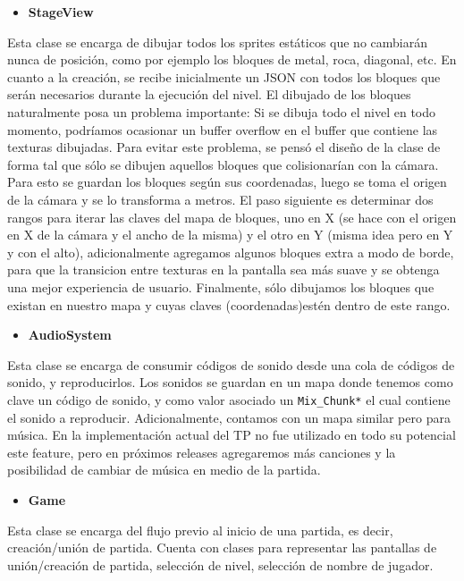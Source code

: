 \documentclass[a4paper]{article}
\begin{document}
\begin{itemize}
	\item \textbf{StageView}
\end{itemize}

Esta clase se encarga de dibujar todos los sprites estáticos que no cambiarán nunca de posición, como por ejemplo los bloques de metal, roca, diagonal, etc.
En cuanto a la creación, se recibe inicialmente un JSON con todos los bloques que serán necesarios durante la ejecución del nivel.
El dibujado de los bloques naturalmente posa un problema importante: Si se dibuja todo el nivel en todo momento, podríamos ocasionar un buffer overflow en el buffer que contiene las texturas dibujadas.
Para evitar este problema, se pensó el diseño de la clase de forma tal que sólo se dibujen aquellos bloques que colisionarían con la cámara. Para esto se guardan los bloques según sus coordenadas, luego se toma el origen de la cámara y se lo transforma a metros.
El paso siguiente es determinar dos rangos para iterar las claves del mapa de bloques, uno en X (se hace con el origen en X de la cámara y el ancho de la misma) y el otro en Y (misma idea pero en Y y con el alto), adicionalmente agregamos algunos bloques extra a modo de borde, para que la transicion entre texturas en la pantalla sea más suave y se obtenga una mejor experiencia de usuario.
Finalmente, sólo dibujamos los bloques que existan en nuestro mapa y cuyas claves (coordenadas)estén dentro de este rango.

\begin{itemize}
	\item \textbf{AudioSystem}
\end{itemize}

Esta clase se encarga de consumir códigos de sonido desde una cola de códigos de sonido, y reproducirlos.
Los sonidos se guardan en un mapa donde tenemos como clave un código de sonido, y como valor asociado un \texttt{Mix\_Chunk*} el cual contiene el sonido a reproducir.
Adicionalmente, contamos con un mapa similar pero para música. En la implementación actual del TP no fue utilizado en todo su potencial este feature, pero en próximos releases agregaremos más canciones y la posibilidad de cambiar de música en medio de la partida.

\begin{itemize}
	\item \textbf{Game}
\end{itemize}

Esta clase se encarga del flujo previo al inicio de una partida, es decir, creación/unión de partida.
Cuenta con clases para representar las pantallas de unión/creación de partida, selección de nivel, selección de nombre de jugador.
\end{document}

